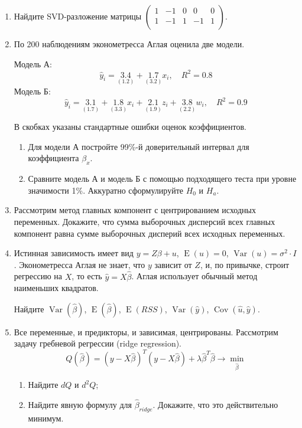 \documentclass[12pt]{article} %
\theoremstyle{definition} %
\DeclareMathOperator{\Cov}{Cov}
\DeclareMathOperator{\Var}{Var}
\DeclareMathOperator{\E}{E}
\def \hb{\hat{\beta}}
\def \hy{\hat{y}}
\begin{document}
\begin{enumerate}
  \item Найдите SVD-разложение матрицы
  $\begin{pmatrix}
   1 & -1 & 0 & 0 & 0\\
   1 & -1 & 1 & -1 & 1\\
  \end{pmatrix}$.

  \item По 200 наблюдениям эконометресса Аглая оценила две модели. 
  
  Модель А:
  \[
  \hy_i = \underset{(1.2)}{3.4} + \underset{(3.2)}{1.7} x_i, \quad R^2 = 0.8 
  \]
  Модель Б:
  \[
  \hy_i = \underset{(1.7)}{3.1} + \underset{(3.3)}{1.8} x_i  + \underset{(1.9)}{2.1} z_i + \underset{(2.2)}{3.8} w_i, \quad R^2 = 0.9
  \]

  В скобках указаны стандартные ошибки оценок коэффициентов. 

  \begin{enumerate}
    \item Для модели А постройте 99\%-й доверительный интервал для коэффициента $\beta_x$.
    \item Сравните модель А и модель Б с помощью подходящего теста при уровне значимости 1\%.
    Аккуратно сформулируйте $H_0$ и $H_a$.
  \end{enumerate}



  \item Рассмотрим метод главных компонент с центрированием исходных переменных.
  Докажите, что  
  сумма выборочных дисперсий всех главных компонент равна сумме выборочных дисперий всех исходных 
  переменных. 
  
  \item Истинная зависимость имеет вид $y=Z\beta + u$, $\E(u)=0$, $\Var(u) = \sigma^2 \cdot I$. 
  Эконометресса Аглая не знает, что $y$ зависит от $Z$, 
  и, по привычке, строит регрессию на $X$, то есть $\hat y = X\hb$.
  Аглая использует обычный метод наименьших квадратов. 
  
  
  Найдите $\Var(\hb)$, $\E(\hb)$, $\E(RSS)$, $\Var(\hat y)$, $\Cov(\hat u, \hat y)$.
  
  \item Все переменные, и предикторы, и зависимая, центрированы. Рассмотрим задачу гребневой регрессии (ridge regression).
  \[
  Q(\hb) = (y - X\hb)^T (y - X\hb) + \lambda \hb^T \hb \to \min_{\hb}
  \]
  
\begin{enumerate}
  \item Найдите $dQ$ и $d^2Q$;
  \item Найдите явную формулу для $\hb_{ridge}$. Докажите, что это действительно минимум. 
\end{enumerate}


\end{enumerate}
\end{document}
